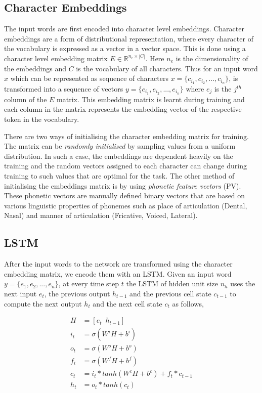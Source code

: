 \documentclass[11pt,letterpaper]{article}
\begin{document}
\subsection{Character Embeddings}

The input words are first encoded into character level embeddings. Character embeddings are a form of distributional representation, where every character of the vocabulary is expressed as a vector in a vector space. This is done using a character level embedding matrix $E \in \mathbb{R}^{n_e \times |C|}$. Here $n_e$ is the dimensionality of the embeddings and $C$ is the vocabulary of all characters. Thus for an input word $x$ which can be represented as sequence of characters $x = \{c_{i_1}, c_{i_2}, ..., c_{i_n}\}$, is transformed into a sequence of vectors $y = \{e_{i_1}, e_{i_2}, ..., e_{i_n}\}$ where $e_j$ is the $j^{th}$ column of the $E$ matrix. This embedding matrix is learnt during training and each column in the matrix represents the embedding vector of the respective token in the vocabulary. 

There are two ways of initialising the character embedding matrix for training. The matrix can be \textit{randomly initialised} by sampling values from a uniform distribution. In such a case, the embeddings are dependent heavily on the training and the random vectors assigned to each character can change during training to such values that are optimal for the task. The other method of initialising the embeddings matrix is by using \textit{phonetic feature vectors} (PV). These phonetic vectors are manually defined binary vectors that are based on various linguistic properties of phonemes such as place of articulation (Dental, Nasal) and manner of articulation (Fricative, Voiced, Lateral).

\subsection{LSTM}

After the input words to the network are transformed using the character embedding matrix, we encode them with an LSTM. Given an input word $y = \{e_1, e_2, ..., e_n\}$, at every time step $t$ the LSTM of hidden unit size $n_h$ uses the next input $e_t$, the previous output $h_{t-1}$ and the previous cell state $c_{t-1}$ to compute the next output $h_t$ and the next cell state $c_t$ as follows,

\begin{align}
H &= [e_t \enspace h_{t-1}] \\
i_t &= \sigma (W^iH + b^i) \\
o_t &= \sigma (W^oH + b^o) \\
f_t &= \sigma (W^fH + b^f) \\
c_t &= i_t * tanh(W^cH + b^c) + f_t * c_{t-1} \\
h_t &= o_t * tanh(c_t)
\end{align}
\end{document}
